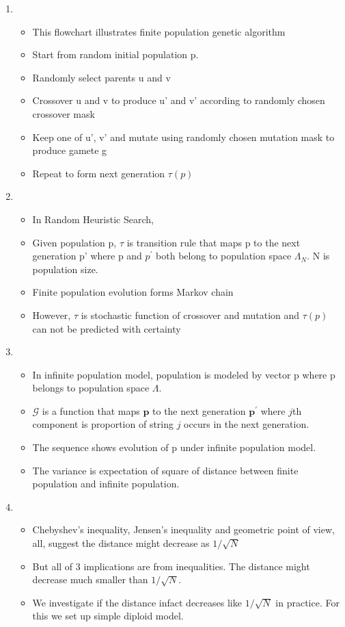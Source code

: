\documentclass{article}
\begin{document}
\begin{enumerate}
\item
  \begin{itemize}
  \item This flowchart illustrates finite population genetic algorithm
  \item Start from random initial population p.
  \item Randomly select parents u and v 
  \item Crossover u and v to produce u' and v' according to randomly chosen crossover mask
  \item Keep one of u', v' and mutate using randomly chosen mutation mask to produce gamete g
  \item Repeat to form next generation $\tau(p)$
  \end{itemize}
  
\item
  \begin{itemize}
  \item In Random Heuristic Search,
  \item Given population p, $\tau$ is transition rule that maps p to
    the next generation p' where p and $p^\prime$ both belong to population space $\Lambda_N$.
    N is population size. 
  \item Finite population evolution forms
    Markov chain
  \item However, $\tau$ is stochastic function of crossover and
    mutation and $\tau(p)$ can not be predicted with
    certainty 
  \end{itemize}
    
\item
  \begin{itemize}
  \item In infinite population model, population is modeled by vector p where p belongs to population space $\Lambda$.    
  \item $\mathcal{G}$ is a function that maps $\bm{p}$ to the next
    generation $\bm{p}^\prime$ where $j$th component is proportion of string $j$
    occurs in the next generation.
  \item The sequence shows evolution of p under infinite population
    model.
  \item The variance is expectation of square of distance between finite population and infinite population.
  \end{itemize}
  
\item
  \begin{itemize}
  \item Chebyshev's inequality, Jensen's inequality and geometric point of view, all, suggest the distance might decrease
    as $1/\sqrt{ N}$
  \item But all of 3 implications are from inequalities. The distance
    might decrease much smaller than $1/\sqrt{ N}$.
  \item We investigate if the distance infact decreases like $1/\sqrt{N}$ in practice. For this we set up
    simple diploid model.
  \end{itemize}
    

\end{enumerate}
\end{document}
